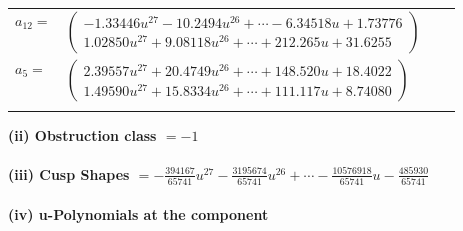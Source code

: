 \documentclass[1p]{elsarticle_modified}
\theoremstyle{definition}
\begin{document}
\begin{tabular}{m{7pt} m{180pt} m{7pt} m{180pt} }
\flushright $a_{12}=$&$\begin{pmatrix}-1.33446 u^{27}-10.2494 u^{26}+\cdots-6.34518 u+1.73776\\1.02850 u^{27}+9.08118 u^{26}+\cdots+212.265 u+31.6255\end{pmatrix}$ \\
\flushright $a_{5}=$&$\begin{pmatrix}2.39557 u^{27}+20.4749 u^{26}+\cdots+148.520 u+18.4022\\1.49590 u^{27}+15.8334 u^{26}+\cdots+111.117 u+8.74080\end{pmatrix}$\\&\end{tabular}
\flushleft \textbf{(ii) Obstruction class $= -1$}\\~\\
\flushleft \textbf{(iii) Cusp Shapes $= -\frac{394167}{65741} u^{27}-\frac{3195674}{65741} u^{26}+\cdots-\frac{10576918}{65741} u-\frac{485930}{65741}$}\\~\\
\newpage\renewcommand{\arraystretch}{1}
\flushleft \textbf{(iv) u-Polynomials at the component}\newline \\
\end{document}
